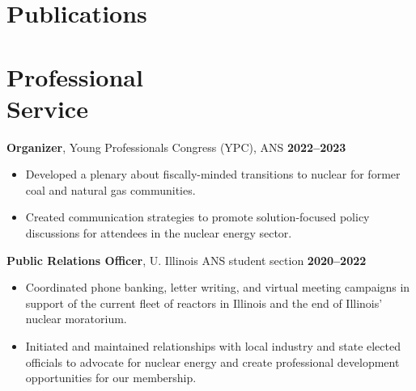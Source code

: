 \documentclass[margin,line]{resume}
\begin{document}
\begin{resume}
    \section{\mysidestyle Publications}

    \begin{bibenum}
        \item {}
        \item {}
        \item {}
        \item {}
    \end{bibenum}

    \section{\mysidestyle Professional\\Service}

    \textbf{Organizer}, Young Professionals Congress (YPC), ANS \hfill \textbf{2022--2023}\vspace{.5mm}\\%
    \begin{itemize}
        \item Developed a plenary about fiscally-minded transitions to nuclear for former coal and natural gas communities.
        \item Created communication strategies to promote solution-focused policy discussions for attendees in the nuclear energy sector.
    \end{itemize}

    \textbf{Public Relations Officer}, U. Illinois ANS student section  \hfill \textbf{2020--2022}\vspace{.5mm}\\%
    \begin{itemize}
        \item Coordinated phone banking, letter writing, and virtual meeting campaigns in support of the current fleet of reactors in Illinois and the end of Illinois' nuclear moratorium.
        \item Initiated and maintained relationships with local industry and state elected officials to advocate for nuclear energy and create professional development opportunities for our membership.
    \end{itemize}


\end{resume}
\end{document}
